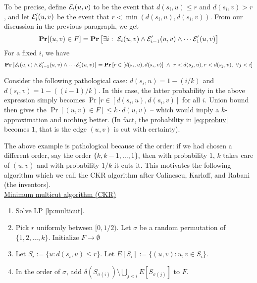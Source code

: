 \documentclass[11pt]{article}
\begin{document}
\noindent
To be precise, define ${\mathcal E}_i(u,v)$ to be the event that $d(s_i,u) \le r$ and $d(s_i,v) > r$, 
and let ${\mathcal E}'_i(u,v)$ be the event that $r < \min(d(s_i,u),d(s_i,v))$.
From our discussion in the previous paragraph, we get 
\begin{equation}\label{eq:probuv}
{\mathbf{Pr}}[(u,v) \in F] = {\mathbf{Pr}}\left[\exists i: ~{\mathcal E}_i(u,v) \wedge {\mathcal E}'_{i-1}(u,v) \wedge \cdots {\mathcal E}'_{1}(u,v)\right]
\end{equation}
\noindent
For a fixed $i$, we have 
$$ {\mathbf{Pr}}\left[{\mathcal E}_i(u,v) \wedge {\mathcal E}'_{i-1}(u,v) \wedge \cdots {\mathcal E}'_{1}(u,v) \right] = {\mathbf{Pr}}\left[r\in[d(s_i,u),d(s_i,v)] ~\wedge~ r < d(s_j,u), r < d(s_j,v), ~\forall j<i \right]$$

\noindent
Consider the following pathological case: $d(s_i,u) = 1 - (i/k)$ and $d(s_i, v) = 1 - ((i-1)/k)$. In this case, 
the latter probability in the above expression simply becomes $\Pr[r\in[d(s_i,u),d(s_i,v)]$ for all $i$.
Union bound then gives the $\Pr[(u,v)\in F] \le k\cdot d(u,v)$ -- which would imply a $k$-approximation
and nothing better.
(In fact, the probability in \eqref{eq:probuv} becomes $1$, that is the edge $(u,v)$ is cut with certainty). 
\medskip

The above example is pathological because of the order: if we had chosen a different order, say the order $\{k,k-1,\ldots,1\}$, 
then with probability $1$, $k$ takes care of $(u,v)$ and with probability $1/k$ it cuts it. This motivates the following algorithm
which we call the CKR algorithm after Calinescu, Karloff, and Rabani (the inventors). \\

\noindent
\underline{Minimum multicut algorithm (CKR)}
\begin{enumerate}
\item Solve LP \eqref{lp:multicut}.
\item Pick $r$ uniformly between $[0,1/2)$. Let $\sigma$ be a random permutation of $\{1,2,\ldots,k\}$. Initialize $F\to \emptyset$
\item Let $S_i := \{u: d(s_i,u) \le r\}$. Let $E[S_i] := \{(u,v): u,v\in S_i\}$. 
\item In the order of $\sigma$, add $\delta\left(S_{\sigma(i)}\right)\setminus \bigcup_{j<i} E[S_{\sigma(j)}]$ to $F$.
\end{enumerate}
\noindent
\end{document}
